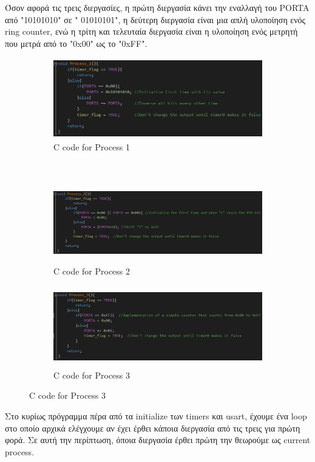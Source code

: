\documentclass{article}
\begin{document}
	\noindent
	Όσον αφορά τις τρεις διεργασίες, η πρώτη διεργασία κάνει την εναλλαγή του PORTA από "10101010" σε " 01010101", η δεύτερη διεργασία είναι μια απλή υλοποίηση ενός ring counter, ενώ η τρίτη και τελευταία διεργασία είναι η υλοποίηση ενός μετρητή που μετρά από το "0x00" ως το "0xFF".  \\
	\begin{figure}[h!]
		\centering
		\begin{subfigure}[t]{0.5\textwidth}
			\centering
			\includegraphics[height=3.5cm, width=\linewidth]{./results/lab8_proc_1.png}
			\caption{C code for Process 1}
		\end{subfigure}%
		~
		\begin{subfigure}[t]{0.5\textwidth}
			\centering
			\includegraphics[height=3.5cm, width=\linewidth]{./results/lab8_proc_2.png}
			\caption{C code for Process 2}
		\end{subfigure}
	
		\begin{subfigure}[t]{0.5\textwidth}
			\centering
			\includegraphics[height=3.5cm, width=\linewidth]{./results/lab8_proc_3.png}
			\caption{C code for Process 3}
		\end{subfigure}
	\end{figure}
	
	\noindent
	Στο κυρίως πρόγραμμα πέρα από τα initialize των timers και usart, έχουμε ένα loop στο οποίο αρχικά ελέγχουμε αν έχει έρθει κάποια διεργασία από τις τρεις για πρώτη φορά. Σε αυτή την περίπτωση, όποια διεργασία έρθει πρώτη την θεωρούμε ως current process.\\
	
\end{document}
